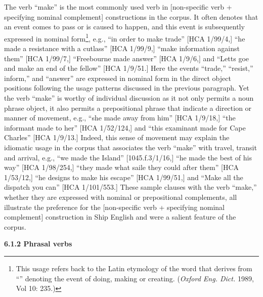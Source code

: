 \begin{styleStandard}
The verb “make” is the most commonly used verb in [non-specific verb + specifying nominal complement] constructions in the corpus. It often denotes that an event comes to pass or is caused to happen, and this event is subsequently expressed in nominal form\footnote{ This usage refers back to the Latin etymology of the word that derives from “” denoting the event of doing, making or creating. (\textit{Oxford Eng. Dict. }1989, Vol 10: 235.) }, e.g., “in order to make trade” [HCA 1/99/4,] “he made a resistance with a cutlass” [HCA 1/99/9,] “make information against them” [HCA 1/99/7,] “Freebourne made answer” [HCA 1/9/6,] and “Letts goe and make an end of the fellow” [HCA 1/9/51.] Here the events “trade,” “resist,” inform,” and “answer” are expressed in nominal form in the direct object positions following the usage patterns discussed in the previous paragraph. Yet the verb “make” is worthy of individual discussion as it not only permits a noun phrase object, it also permits a prepositional phrase that indicate a direction or manner of movement, e.g., “she made away from him” [HCA 1/9/18,] “the informant made to her” [HCA 1/52/124,] and “this examinant made for Cape Charles” [HCA 1/9/13.] Indeed, this sense of movement may explain the idiomatic usage in the corpus that associates the verb “make” with travel, transit and arrival, e.g., “we made the Island” [1045.f.3/1/16,] “he made the best of his way” [HCA 1/98/254,] “they made what saile they could after them” [HCA 1/53/12,] “he designs to make his escape” [HCA 1/99/51,] and “Make all the dispatch you can” [HCA 1/101/553.] These sample clauses with the verb “make,” whether they are expressed with nominal or prepositional complements, all illustrate the preference for the [non-specific verb + specifying nominal complement] construction in Ship English and were a salient feature of the corpus. 
\end{styleStandard}

\begin{styleStandard}
\textbf{6.1.2 Phrasal verbs}
\end{styleStandard}

